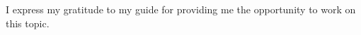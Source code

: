 \begin{Acknowledgement}
    \noindent
    I express my gratitude to my guide \guide for providing me the 
    opportunity to work on this topic.
    

\end{Acknowledgement}